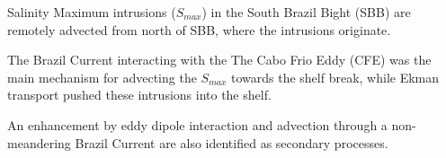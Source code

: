 \documentclass[draft]{agujournal2019}
\begin{document}








\begin{keypoints}
\item Salinity Maximum intrusions (\textit{$S_{max}$}) in the South Brazil Bight (SBB) are remotely advected from north of SBB, where the intrusions originate.
\item The Brazil Current interacting with the The Cabo Frio Eddy (CFE) was the main mechanism for advecting the \textit{$S_{max}$} towards the shelf break, while Ekman transport pushed these intrusions into the shelf.
\item An enhancement by eddy dipole interaction and advection through a non-meandering Brazil Current are also identified as secondary processes.
\end{keypoints}

%
%
\end{document}
